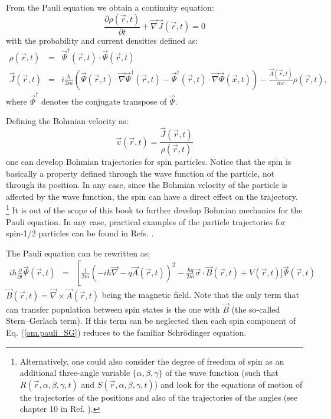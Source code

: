 \documentclass[nofootinbib, secnumarabic, amsmath, nobibnotes,10pt,aps,pra]{revtex4-1}
\newcommand{\eref}[1]{Eq. (\ref{#1})}
\begin{document}
From the Pauli equation we obtain a continuity equation:
\begin{equation}
\label{om.difcurrent_density_pauli}
\frac{\partial\rho(\vec{r},t)}{\partial t} + \vec{\nabla} \vec{J}(\vec{r},t) = 0
\end{equation}
with the probability and current densities defined as:
\begin{eqnarray}
\label{om.rhospin}
\rho(\vec r,t) & = & \vec \Psi^{\dagger}(\vec{r},t)\cdot\vec \Psi(\vec{r},t) \\
\label{om.currentspin}
\vec J(\vec{r},t) & = & i \frac {\hbar} {2 m}
\left(\vec\Psi(\vec{r},t)\cdot {\vec{\nabla} \vec
\Psi^{\dagger}(\vec{r},t)} - \vec\Psi^{\dagger}(\vec{r},t) \cdot
{\vec{\nabla} \vec \Psi(\vec{x},t)} \right)-\frac {\vec A(\vec r,t)} {mc} \rho(\vec r,t),
\end{eqnarray}
where $\vec\Psi^{\dagger}$ denotes the conjugate transpose of $\vec\Psi$.

Defining the Bohmian velocity as:
\begin{equation}
\vec v(\vec r,t) = \frac{ \vec{J}(\vec{r},t)}{\rho(\vec r,t)}
\end{equation}
one can develop Bohmian trajectories for spin particles. Notice that the spin is basically a property defined through the wave function of the particle, not through its position. In any case, since the Bohmian velocity of the particle is affected by the wave function, the spin can have a direct effect on the trajectory. \footnote{Alternatively, one could also consider the degree of freedom of spin as an additional three-angle variable $\{\alpha,\beta,\gamma\}$ of the wave function (such that $R(\vec r,\alpha,\beta,\gamma,t)$ and $S(\vec r,\alpha,\beta,\gamma,t)$) and look for the equations of motion of the trajectories of the positions and also of the trajectories of the angles (see chapter 10 in Ref. \cite{om.Holand1993}).} It is out of the scope of this book to further develop Bohmian mechanics for the Pauli equation.
In any case, practical examples of the particle trajectories for spin-1/2 particles can be found in Refs. \cite{om.Holland2003,om.colijn2002}.

The Pauli equation can be rewritten as:
\begin{eqnarray}
\label{om.pauli_SG}
i \hbar \frac{ \partial}{\partial t} \vec \Psi(\vec r,t) &=&
\left[ \frac{1}{2m} \left(- i \hbar \vec{\nabla} - q \vec{A}(\vec r,t)\right) ^2 -\frac{\hbar q}{2m} \vec{\sigma}\cdot\vec{B}(\vec r,t)\right.+ V(\vec r,t) \bigg]\vec \Psi(\vec r,t)
\end{eqnarray}
$\vec{B}(\vec r,t) = \vec{\nabla} \times \vec{A}(\vec r,t)$ being
the magnetic field. Note that the only term that can transfer
population between spin states is the one with $\vec{B}$ (the
so-called Stern--Gerlach term). If this term can be neglected then
each spin component of \eref{om.pauli_SG} reduces to the familiar
Schr\"odinger equation. 
\end{document}
